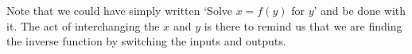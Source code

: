 \smallskip 

Note that we could have simply written `Solve $x=f(y)$ for $y$' and be done with it.  The act of interchanging the $x$ and $y$ is there to remind us that we are finding the inverse function by switching the inputs and outputs.  

\medskip

